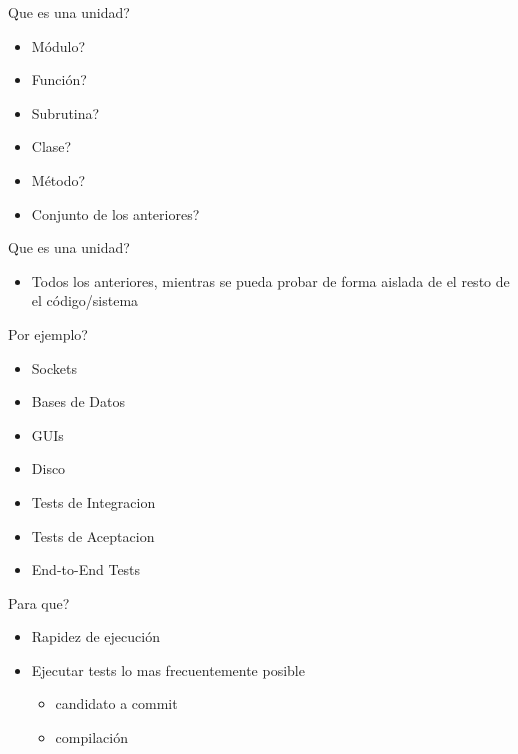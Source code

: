 
\begin{frame}{Que es una unidad?}
    \begin{itemize}
        \item Módulo?
        \item Función?
        \item Subrutina?
        \item Clase?
        \item Método?
        \item Conjunto de los anteriores?
    \end{itemize}
\end{frame}

\begin{frame}{Que es una unidad?}
    \begin{itemize}
        \item Todos los anteriores, mientras se pueda probar de forma aislada de el resto de el código/sistema
    \end{itemize}
\end{frame}

\begin{frame}{Por ejemplo?}
    \begin{itemize}
        \item Sockets
        \item Bases de Datos
        \item GUIs
        \item Disco
    \end{itemize}

    \begin{itemize}
        \item Tests de Integracion
        \item Tests de Aceptacion
        \item End-to-End Tests
    \end{itemize}
\end{frame}

\begin{frame}{Para que?}
    \begin{itemize}
        \item Rapidez de ejecución
        \item Ejecutar tests lo mas frecuentemente posible
        \begin{itemize}
            \item candidato a commit
            \item compilación
        \end{itemize}
    \end{itemize}
\end{frame}

